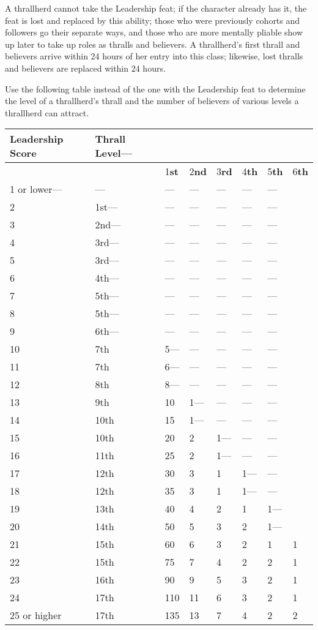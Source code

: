 \documentclass{article}
\begin{document}
A thrallherd cannot take the Leadership feat; if the character already has it, 
the feat is lost and replaced by this ability; those who were previously cohorts 
and followers go their separate ways, and those who are more mentally pliable show 
up later to take up roles as thralls and believers. A thrallherd's first thrall 
and believers arrive within 24 hours of her entry into this class; likewise, lost 
thralls and believers are replaced within 24 hours.

Use the following table instead of the one with the Leadership feat to determine 
the level of a thrallherd's thrall and the number of believers of various levels 
a thrallherd can attract.

\vspace{12pt}
\begin{tabular}{|>{\raggedright}p{48pt}|>{\raggedright}p{34pt}|>{\raggedright}p{15pt}|>{\raggedright}p{15pt}|>{\raggedright}p{15pt}|>{\raggedright}p{15pt}|>{\raggedright}p{15pt}|>{\raggedright}p{16pt}|}
\hline
L\textbf{eadership Score } & T\textbf{hrall Level}--- & \multicolumn{6}{p{95pt}|}{\section*{ 
\textbf{Number of Believers by Level ---}}}\tabularnewline
\hline
 &  & 1\textbf{st} & 2\textbf{nd} & 3\textbf{rd} & 4\textbf{th} & 5\textbf{th} & 6\textbf{th}\tabularnewline
\hline
1 or lower--- & --- & --- & --- & --- & --- & --- & \tabularnewline
\hline
2 & 1st--- & --- & --- & --- & --- & --- & \tabularnewline
\hline
3 & 2nd--- & --- & --- & --- & --- & --- & \tabularnewline
\hline
4 & 3rd--- & --- & --- & --- & --- & --- & \tabularnewline
\hline
5 & 3rd--- & --- & --- & --- & --- & --- & \tabularnewline
\hline
6 & 4th--- & --- & --- & --- & --- & --- & \tabularnewline
\hline
7 & 5th--- & --- & --- & --- & --- & --- & \tabularnewline
\hline
8 & 5th--- & --- & --- & --- & --- & --- & \tabularnewline
\hline
9 & 6th--- & --- & --- & --- & --- & --- & \tabularnewline
\hline
10 & 7th & 5--- & --- & --- & --- & --- & \tabularnewline
\hline
11 & 7th & 6--- & --- & --- & --- & --- & \tabularnewline
\hline
12 & 8th & 8--- & --- & --- & --- & --- & \tabularnewline
\hline
13 & 9th & 10 & 1--- & --- & --- & --- & \tabularnewline
\hline
14 & 10th & 15 & 1--- & --- & --- & --- & \tabularnewline
\hline
15 & 10th & 20 & 2 & 1--- & --- & --- & \tabularnewline
\hline
16 & 11th & 25 & 2 & 1--- & --- & --- & \tabularnewline
\hline
17 & 12th & 30 & 3 & 1 & 1--- & --- & \tabularnewline
\hline
18 & 12th & 35 & 3 & 1 & 1--- & --- & \tabularnewline
\hline
19 & 13th & 40 & 4 & 2 & 1 & 1--- & \tabularnewline
\hline
20 & 14th & 50 & 5 & 3 & 2 & 1--- & \tabularnewline
\hline
21 & 15th & 60 & 6 & 3 & 2 & 1 & 1\tabularnewline
\hline
22 & 15th & 75 & 7 & 4 & 2 & 2 & 1\tabularnewline
\hline
23 & 16th & 90 & 9 & 5 & 3 & 2 & 1\tabularnewline
\hline
24 & 17th & 110 & 11 & 6 & 3 & 2 & 1\tabularnewline
\hline
25 or higher & 17th & 135 & 13 & 7 & 4 & 2 & 2\tabularnewline
\hline
\end{tabular}
\end{document}
